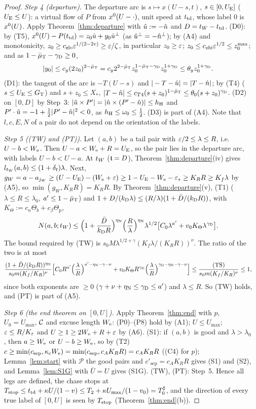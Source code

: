 \begin{proof}
\emph{Step 4 (departure).} The departure arc is $s\mapsto x(U-s,t)$, $s\in[0,U_{\mathrm E}]$ ($U_{\mathrm E}\le U$): a virtual flow of $P$ from
$x^0(U-\cdot)$, unit speed at $t_{\mathrm{td}}$, whose label $0$ is $x^0(U)$. Apply Theorem~\ref{thm:departure} with $\hat u:=-\hat n$ and
$D=t_W-t_{\mathrm{td}}$. (D0): by (T5), $x^0(U)-P(t_{\mathrm{td}})=z_0\hat u+y_0\hat u^\perp$ (as $\hat u^\perp=-\hat n^\perp$); by (A4) and monotonicity,
$z_0\ge c_{\mathrm{zlo}}\varepsilon^{1/(2-2v)}\ge\varepsilon/\zeta$, in particular $z_0\ge\varepsilon$; $z_0\le c_{\mathrm{zhi}}\varepsilon^{1/2}\le z_0^{\max}$; and as
$1-\bar\mu_{\mathrm T}-\gamma_{\mathrm D}\ge0$,
\[
|y_0|\le c_y(2z_0)^{2-\bar\mu_{\mathrm T}}=c_y2^{2-\bar\mu_{\mathrm T}}z_0^{1-\bar\mu_{\mathrm T}-\gamma_{\mathrm D}}z_0^{1+\gamma_{\mathrm D}}\le\theta_yz_0^{1+\gamma_{\mathrm D}}.
\]
(D1): the tangent of the arc is $-T(U-s)$ and $|-T-\hat u|=|T-\hat n|$; by (T4) ($s\le U_{\mathrm E}\le G_{\mathrm T}$) and $s+z_0\le X_*$,
$|T-\hat n|\le c_{T4}(s+z_0)^{1-\bar\mu_{\mathrm T}}\le\theta_0(s+z_0)^{\gamma_{\mathrm D}}$. (D2) on $[0,D]$ by Step~3:
$|\hat u\times P'|=|\hat n\times(P'-\hat n)|\le h_{\mathrm H}$ and $P'\cdot\hat u=-1+\frac12|P'-\hat n|^2<0$, as $h_{\mathrm H}\le\omega_0\le\frac12$.
(D3) is part of (A4). Note that $l,c,E,N$ of a pair do not depend on the orientation of the labels.

\emph{Step 5 ((TW) and (PT)).} Let $(a,b)$ be a tail pair with $\varepsilon/2\le\lambda\le R$, i.e.\ $U-b<W_{\mathrm e}$. Then $U-a<W_{\mathrm e}+R=U_{\mathrm E}$, so the
pair lies in the departure arc, with labels $U-b<U-a$. At $t_W$ ($\mathfrak t=D$), Theorem~\ref{thm:departure}(iv) gives
$l_{t_W}(a,b)\le(1+\delta_t)\lambda$. Next, $g_W=a-a_{j_W}\ge(U-U_{\mathrm E})-(W_{\mathrm e}+\varepsilon)\ge1-U_{\mathrm E}-W_{\mathrm e}-\varepsilon_*\ge K_RR\ge K_f\lambda$ by (A5), so
$\min(g_W,K_RR)=K_RR$. By Theorem~\ref{thm:departure}(v), (T1) ($\lambda\le R\le\lambda_0$, $a'\le1-\bar\mu_{\mathrm T}$) and
$1+D/(k_{\mathrm D}\lambda)\le(R/\lambda)(1+\bar D/(k_{\mathrm D} R))$, with $K_\Theta:=c_n\Theta_b+c_\beta\Theta_{\mathrm p}$,
\[
N(a,b;t_W)\le\Bigl(1+\frac{\bar D}{k_{\mathrm D} R}\Bigr)^{\eta_{\mathrm N}}\Bigl(\frac R\lambda\Bigr)^{\eta_{\mathrm N}}\lambda^{1/2}\bigl[C_0\lambda^{a'}+v_0 K_\Theta\lambda^{\gamma_{\mathrm D}}\bigr].
\]
The bound required by (TW) is $s_0M\lambda^{1/2+\gamma}(K_f\lambda/(K_RR))^\nu$. The ratio of the two is at most
\[
\frac{(1+\bar D/(k_{\mathrm D} R))^{\eta_{\mathrm N}}}{s_0m(K_f/K_R)^\nu}\Bigl[C_0R^{a'}\Bigl(\frac\lambda R\Bigr)^{a'-\eta_{\mathrm N}-\gamma-\nu}
+v_0 K_\Theta R^{\gamma_{\mathrm D}}\Bigl(\frac\lambda R\Bigr)^{\gamma_{\mathrm D}-\eta_{\mathrm N}-\gamma-\nu}\Bigr]\le\frac{\mathrm{(TS)}}{s_0m(K_f/K_R)^\nu}\le1,
\]
since both exponents are $\ge0$ ($\gamma+\nu+\eta_{\mathrm N}\le\gamma_{\mathrm D}\le a'$) and $\lambda\le R$. So (TW) holds, and (PT) is part of (A5).

\emph{Step 6 (the end theorem on $[0,U]$).} Apply Theorem~\ref{thm:end} with $p$, $U_0=U_{\max}$, $\mathcal C$ and excuse length $W_{\mathrm e}$:
(P0)--(P8) hold by (A1); $U\le U_{\max}$; $\varepsilon\le R/K_\varepsilon$ and $U\ge1\ge2W_{\mathrm e}+R+\varepsilon$ by (A6). (S1): if $(a,b)$ is good and $\lambda>\lambda_0$,
then $a\ge W_{\mathrm e}$ or $U-b\ge W_{\mathrm e}$, so by (T2) $c\ge\min(c_{\mathrm{sep}},\kappa_{\mathrm c}W_{\mathrm e})=\min(c_{\mathrm{sep}},c_AK_RR)=c_AK_RR$ ((C4) for $p$);
Lemma~\ref{lem:start} with $\mathcal P$ the good pairs and $c'_{\mathrm{sep}}=c_AK_RR$ gives (S1) and (S2), and Lemma~\ref{lem:S1G}
with $\bar U=U$ gives (S1G). (TW), (PT): Step~5. Hence
all legs are defined, the chase stops at $T_{\mathrm{stop}}\le t_{\mathrm{td}}+\kappa U/(1-v)\le T_2+\kappa U_{\max}/(1-v_0)=T_0^\sharp$, and the direction of
every true label of $[0,U]$ is seen by $T_{\mathrm{stop}}$ (Theorem~\ref{thm:end}(b)).


\end{proof}
